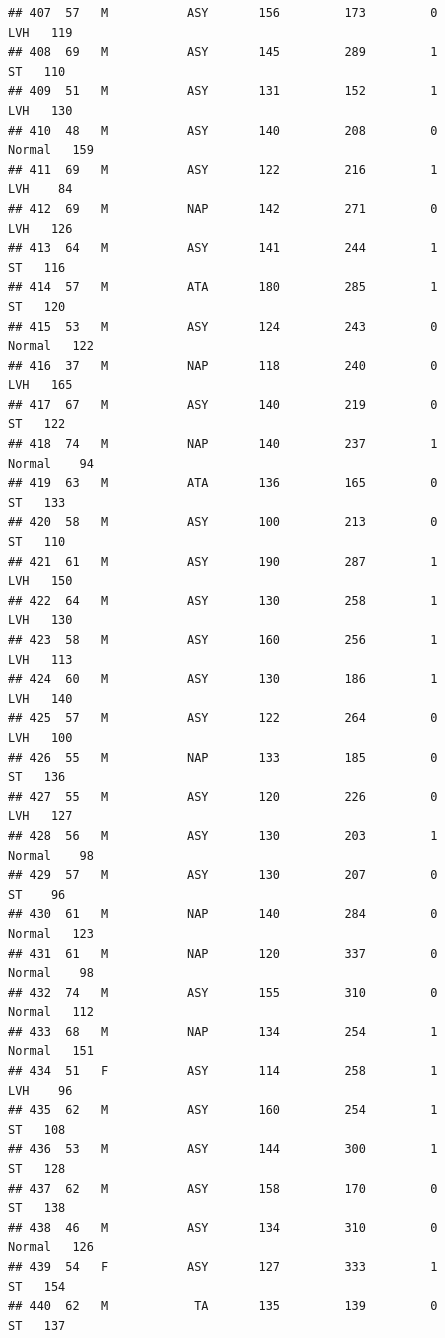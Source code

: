 \documentclass[
]{article}
\begin{document}
\begin{verbatim}
## 407  57   M           ASY       156         173         0        LVH   119
## 408  69   M           ASY       145         289         1         ST   110
## 409  51   M           ASY       131         152         1        LVH   130
## 410  48   M           ASY       140         208         0     Normal   159
## 411  69   M           ASY       122         216         1        LVH    84
## 412  69   M           NAP       142         271         0        LVH   126
## 413  64   M           ASY       141         244         1         ST   116
## 414  57   M           ATA       180         285         1         ST   120
## 415  53   M           ASY       124         243         0     Normal   122
## 416  37   M           NAP       118         240         0        LVH   165
## 417  67   M           ASY       140         219         0         ST   122
## 418  74   M           NAP       140         237         1     Normal    94
## 419  63   M           ATA       136         165         0         ST   133
## 420  58   M           ASY       100         213         0         ST   110
## 421  61   M           ASY       190         287         1        LVH   150
## 422  64   M           ASY       130         258         1        LVH   130
## 423  58   M           ASY       160         256         1        LVH   113
## 424  60   M           ASY       130         186         1        LVH   140
## 425  57   M           ASY       122         264         0        LVH   100
## 426  55   M           NAP       133         185         0         ST   136
## 427  55   M           ASY       120         226         0        LVH   127
## 428  56   M           ASY       130         203         1     Normal    98
## 429  57   M           ASY       130         207         0         ST    96
## 430  61   M           NAP       140         284         0     Normal   123
## 431  61   M           NAP       120         337         0     Normal    98
## 432  74   M           ASY       155         310         0     Normal   112
## 433  68   M           NAP       134         254         1     Normal   151
## 434  51   F           ASY       114         258         1        LVH    96
## 435  62   M           ASY       160         254         1         ST   108
## 436  53   M           ASY       144         300         1         ST   128
## 437  62   M           ASY       158         170         0         ST   138
## 438  46   M           ASY       134         310         0     Normal   126
## 439  54   F           ASY       127         333         1         ST   154
## 440  62   M            TA       135         139         0         ST   137

\end{verbatim}
\end{document}
